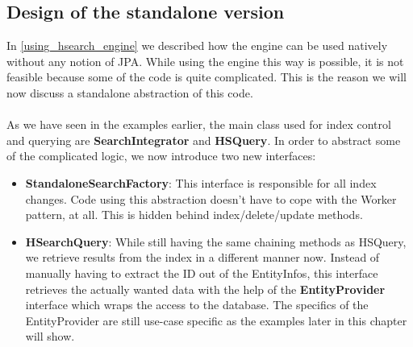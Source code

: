 \pagebreak

\subsection{Design of the standalone version} \label{standalone_hibernate_search}

In \ref{using_hsearch_engine} we described how the engine can be used natively without any notion of JPA. While using the engine this way is possible, it is not feasible because some of the code is quite complicated. This is the reason we will now discuss a standalone abstraction of this code.
\\\\
As we have seen in the examples earlier, the main class used for index control and querying are \textbf{SearchIntegrator} and \textbf{HSQuery}. In order to abstract some of the complicated logic, we now introduce two new interfaces: 

\begin{itemize}
	\item \textbf{StandaloneSearchFactory}: This interface is responsible for all index changes. Code using this abstraction doesn't have to cope with the Worker pattern, at all. This is hidden behind index/delete/update methods.
	
	\item \textbf{HSearchQuery}: While still having the same chaining methods as HSQuery, we retrieve results from the index in a different manner now. Instead of manually having to extract the ID out of the EntityInfos, this interface retrieves the actually wanted data with the help of the \textbf{EntityProvider} interface which wraps the access to the database. The specifics of the EntityProvider are still use-case specific as the examples later in this chapter will show.
\end{itemize}

\pagebreak

